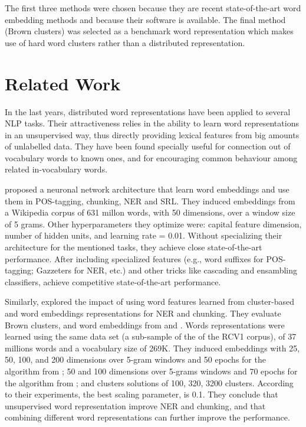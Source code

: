 \documentclass[11pt]{article}
\begin{document}
The first three methods were chosen because they are recent
state-of-the-art word embedding methods and because their software is
available. The final method (Brown clusters) was selected as a benchmark
word representation which makes use of hard word clusters rather than
a distributed representation.


\section{Related Work}
In the last years, distributed word representations have been applied
to several NLP tasks. Their attractiveness relies in the ability to learn  word representations in an unsupervised way, thus directly providing lexical features from big amounts of unlabelled data.
They have been found specially useful for connection out of vocabulary words to known ones, and for encouraging common behaviour among related in-vocabulary words.


 proposed a neuronal network architecture
that learn word embeddings and use them in POS-tagging, chunking, NER and SRL. They induced embeddings from a Wikipedia corpus of 631 millon words, with 50 dimensions, over a window size of 5 grams.
Other hyperparameters they optimize were: capital feature dimension, number of hidden units, and learning rate = 0.01. 
Without specializing their architecture for the mentioned tasks, they achieve close state-of-the-art performance. After including specialized features (e.g., word suffixes for POS-tagging;  Gazzeters for NER, etc.) and other tricks like cascading and ensambling classifiers, achieve competitive state-of-the-art performance.

Similarly,  explored the impact of using word
features learned from cluster-based and word embeddings representations
for NER and chunking. 
They evaluate Brown clusters, and word embeddings from  
and . Words representations were learned using the same data set (a sub-sample of the of the RCV1 corpus), of 37 millions words and a vocabulary size of 269K.
They induced embeddings with 25, 50, 100, and 200 dimensions over 5-gram windows and 50 epochs for the algorithm from \cite{collobert2011natural}; 
50 and 100 dimensions over 5-grams windows and 70 epochs for the algorithm from \cite{Mnih2008}; and clusters solutions of 100, 320, 3200 clusters.
According to their experiments, the best scaling parameter, is 0.1.
They conclude that unsupervised word representation improve NER and chunking, and that combining different word representations can further improve the performance.
\end{document}
